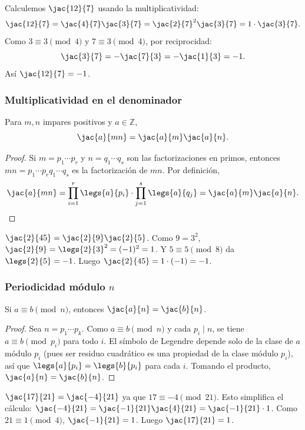\begin{ejemplo}
Calculemos $\jac{12}{7}$ usando la multiplicatividad:
\[\jac{12}{7}=\jac{4}{7}\jac{3}{7}=\jac{2}{7}^2\jac{3}{7}=1\cdot\jac{3}{7}.\]
Como $3\equiv3\pmod4$ y $7\equiv3\pmod4$, por reciprocidad:
\[\jac{3}{7}=-\jac{7}{3}=-\jac{1}{3}=-1.\]
Así $\jac{12}{7}=-1$.
\end{ejemplo}

\subsubsection{Multiplicatividad en el denominador}

\begin{teorema}\label{t3}
Para $m,n$ impares positivos y $a\in\mathbb{Z}$,
\[
\jac{a}{mn}=\jac{a}{m}\jac{a}{n}.
\]
\end{teorema}
\begin{proof}
Si $m=p_1\cdots p_r$ y $n=q_1\cdots q_s$ son las factorizaciones en primos, entonces $mn=p_1\cdots p_r q_1\cdots q_s$ es la factorización de $mn$. Por definición,
\[
\jac{a}{mn}=\prod_{i=1}^r\legs{a}{p_i}\cdot\prod_{j=1}^s\legs{a}{q_j}=\jac{a}{m}\jac{a}{n}. \qedhere
\]
\end{proof}

\begin{ejemplo}
$\jac{2}{45}=\jac{2}{9}\jac{2}{5}$. Como $9=3^2$, $\jac{2}{9}=\legs{2}{3}^2=(-1)^2=1$. Y $5\equiv5\pmod8$ da $\legs{2}{5}=-1$. Luego $\jac{2}{45}=1\cdot(-1)=-1$.
\end{ejemplo}

\subsubsection{Periodicidad módulo $n$}

\begin{teorema}\label{t4}
Si $a\equiv b\pmod n$, entonces $\jac{a}{n}=\jac{b}{n}$.
\end{teorema}
\begin{proof}
Sea $n=p_1\cdots p_k$. Como $a\equiv b\pmod n$ y cada $p_i\mid n$, se tiene $a\equiv b\pmod{p_i}$ para todo $i$. El símbolo de Legendre depende solo de la clase de $a$ módulo $p_i$ (pues ser residuo cuadrático es una propiedad de la clase módulo $p_i$), así que $\legs{a}{p_i}=\legs{b}{p_i}$ para cada $i$. Tomando el producto, $\jac{a}{n}=\jac{b}{n}$.
\end{proof}

\begin{ejemplo}
$\jac{17}{21}=\jac{-4}{21}$ ya que $17\equiv-4\pmod{21}$. Esto simplifica el cálculo: $\jac{-4}{21}=\jac{-1}{21}\jac{4}{21}=\jac{-1}{21}\cdot1$. Como $21\equiv1\pmod4$, $\jac{-1}{21}=1$. Luego $\jac{17}{21}=1$.
\end{ejemplo}

